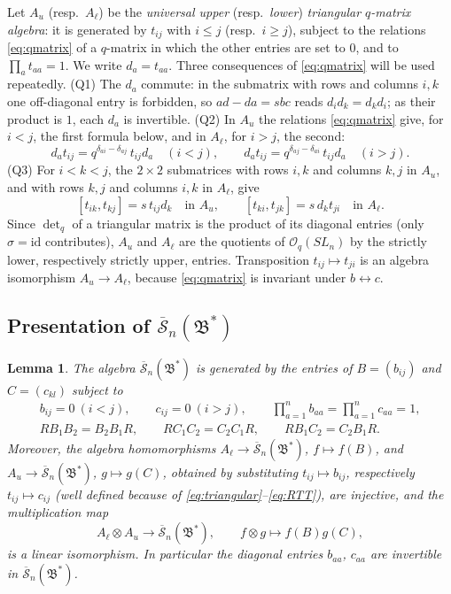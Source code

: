 \documentclass[11pt]{article}
\newtheorem{lemma}[theorem]{Lemma}
\theoremstyle{remark}
\newcommand{\redS}{\overline{\mathcal S}_n}
\newcommand{\Bstar}{\mathfrak B^*}
\newcommand{\ot}{\otimes}
\newcommand{\id}{\mathrm{id}}
\newcommand{\Oq}{\mathcal O_q(SL_n)}
\begin{document}
Let $A_u$ (resp.\ $A_\ell$) be the \emph{universal upper} (resp.\
\emph{lower}) \emph{triangular $q$-matrix algebra}: it is generated by
$t_{ij}$ with $i\le j$ (resp.\ $i\ge j$), subject to the relations
\eqref{eq:qmatrix} of a $q$-matrix in which the other entries are set
to $0$, and to $\prod_at_{aa}=1$. We write $d_a=t_{aa}$. Three
consequences of \eqref{eq:qmatrix} will be used repeatedly.
(Q1) The $d_a$ commute: in the submatrix with rows and columns $i,k$
one off-diagonal entry is forbidden, so $ad-da=sbc$ reads
$d_id_k=d_kd_i$; as their product is $1$, each $d_a$ is invertible.
(Q2) In $A_u$ the relations \eqref{eq:qmatrix} give, for $i<j$, the
first formula below, and in $A_\ell$, for $i>j$, the second:
\begin{equation}\label{eq:toralmatrix}
 d_at_{ij}=q^{\delta_{ai}-\delta_{aj}}\,t_{ij}d_a\quad(i<j),\qquad
 d_at_{ij}=q^{\delta_{aj}-\delta_{ai}}\,t_{ij}d_a\quad(i>j).
\end{equation}
(Q3) For $i<k<j$, the $2\times2$ submatrices with rows $i,k$ and
columns $k,j$ in $A_u$, and with rows $k,j$ and columns $i,k$ in $A_\ell$,
give
\begin{equation}\label{eq:upperrec}
 [t_{ik},t_{kj}]=s\,t_{ij}d_k\quad\text{in }A_u,\qquad
 [t_{ki},t_{jk}]=s\,d_kt_{ji}\quad\text{in }A_\ell .
\end{equation}
Since $\det_q$ of a triangular matrix is the product of its diagonal
entries (only $\sigma=\id$ contributes), $A_u$ and $A_\ell$ are the
quotients of $\Oq$ by the strictly lower, respectively strictly upper,
entries. Transposition $t_{ij}\mapsto t_{ji}$ is an algebra isomorphism
$A_u\to A_\ell$, because \eqref{eq:qmatrix} is invariant under
$b\leftrightarrow c$.

\subsection{Presentation of \texorpdfstring{$\redS(\Bstar)$}{the reduced algebra}}

\begin{lemma}\label{lem:skein}
The algebra $\redS(\Bstar)$ is generated by the entries of
$B=(b_{ij})$ and $C=(c_{kl})$ subject to
\begin{gather}
 b_{ij}=0\ (i<j),\qquad c_{ij}=0\ (i>j),\qquad
 \prod_{a=1}^n b_{aa}=\prod_{a=1}^n c_{aa}=1, \label{eq:triangular}\\
 RB_1B_2=B_2B_1R,\qquad
 RC_1C_2=C_2C_1R,\qquad
 RB_1C_2=C_2B_1R. \label{eq:RTT}
\end{gather}
Moreover, the algebra homomorphisms $A_\ell\to\redS(\Bstar)$,
$f\mapsto f(B)$, and $A_u\to\redS(\Bstar)$, $g\mapsto g(C)$, obtained
by substituting $t_{ij}\mapsto b_{ij}$, respectively $t_{ij}\mapsto
c_{ij}$ (well defined because of
\eqref{eq:triangular}--\eqref{eq:RTT}), are injective, and the
multiplication map
\begin{equation}\label{eq:skeinfactor}
 A_\ell\ot A_u\longrightarrow\redS(\Bstar),\qquad
 f\ot g\longmapsto f(B)g(C),
\end{equation}
is a linear isomorphism. In particular the diagonal entries
$b_{aa}$, $c_{aa}$ are invertible in $\redS(\Bstar)$.
\end{lemma}
\end{document}
